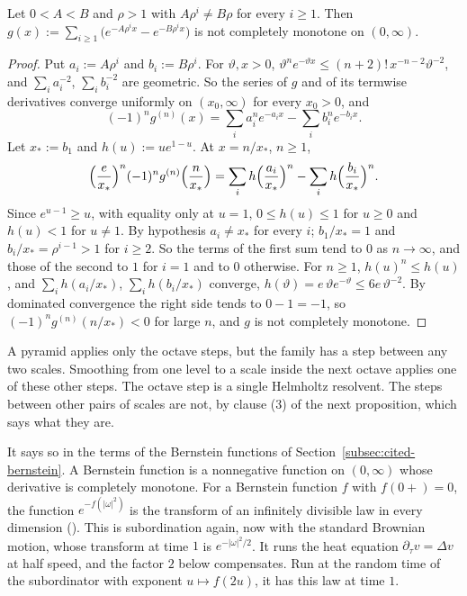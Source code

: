 \begin{lemma}
\label{lem:cm-uncancelled-atom}

Let $0 < A < B$ and $\rho > 1$ with $A\rho^i \ne B\rho$ for every $i \ge 1$. Then
$g(x) := \sum_{i \ge 1}\bigl(e^{-A\rho^ix} - e^{-B\rho^ix}\bigr)$ is not completely monotone on
$(0, \infty)$.
\end{lemma}

\begin{proof}
Put $a_i := A\rho^i$ and $b_i := B\rho^i$. For $\vartheta, x > 0$,
$\vartheta^ne^{-\vartheta x} \le (n + 2)!\,x^{-n-2}\vartheta^{-2}$, and $\sum_ia_i^{-2}$,
$\sum_ib_i^{-2}$ are geometric. So the series of $g$ and of its termwise derivatives converge
uniformly on $(x_0, \infty)$ for every $x_0 > 0$, and
\[
  (-1)^ng^{(n)}(x) = \sum_ia_i^ne^{-a_ix} - \sum_ib_i^ne^{-b_ix} .
\]
Let $x_* := b_1$ and $h(u) := ue^{1-u}$. At $x = n/x_*$, $n \ge 1$,
\[
  \Bigl(\frac{e}{x_*}\Bigr)^n(-1)^ng^{(n)}\Bigl(\frac{n}{x_*}\Bigr)
   = \sum_ih\Bigl(\frac{a_i}{x_*}\Bigr)^n - \sum_ih\Bigl(\frac{b_i}{x_*}\Bigr)^n .
\]
Since $e^{u-1} \ge u$, with equality only at $u = 1$, $0 \le h(u) \le 1$ for $u \ge 0$ and
$h(u) < 1$ for $u \ne 1$. By hypothesis $a_i \ne x_*$ for every $i$; $b_1/x_* = 1$ and
$b_i/x_* = \rho^{i-1} > 1$ for $i \ge 2$. So the terms of the first sum tend to $0$ as $n \to \infty$,
and those of the second to $1$ for $i = 1$ and to $0$ otherwise. For $n \ge 1$, $h(u)^n \le h(u)$,
and $\sum_ih(a_i/x_*)$, $\sum_ih(b_i/x_*)$ converge, $h(\vartheta) = e\,\vartheta e^{-\vartheta} \le
6e\,\vartheta^{-2}$. By dominated convergence the right side tends to $0 - 1 = -1$, so
$(-1)^ng^{(n)}(n/x_*) < 0$ for large $n$, and $g$ is not completely monotone.
\end{proof}

A pyramid applies only the octave steps, but the family has a step between any two scales.
Smoothing from one level to a scale inside the next octave applies one of these other steps. The
octave step is a single Helmholtz resolvent. The steps between other pairs of scales are not, by
clause (3) of the next proposition, which says what they are.

It says so in the terms of the Bernstein functions of Section~\ref{subsec:cited-bernstein}. A
Bernstein function is a nonnegative function on $(0, \infty)$ whose derivative is completely
monotone. For a Bernstein function $f$ with $f(0{+}) = 0$, the function $e^{-f(|\omega|^2)}$ is the
transform of an infinitely divisible law in every dimension (). This is subordination
again, now with the standard Brownian motion, whose transform at time $1$ is $e^{-|\omega|^2/2}$.
It runs the heat equation $\partial_\tau v = \Delta v$ at half speed, and the factor $2$ below
compensates. Run at the random time of the subordinator with exponent $u \mapsto f(2u)$, it has
this law at time $1$.

